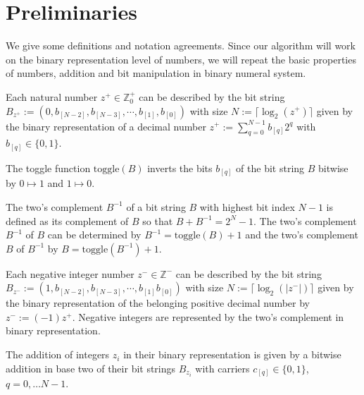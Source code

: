\section{Preliminaries}
\label{s:preliminaries}
We give some definitions and notation agreements. Since our algorithm will work on the binary representation level of numbers, we will repeat the basic properties of numbers, addition and bit manipulation in binary numeral system.


\begin{definition}
    Each natural number $z^{+} \in \mathbb{Z}^{+}_{0}$ can be described by the bit string $B_{z^{+}} := \left(0,b_{[N-2]}, b_{[N-3]},\cdots, b_{[1]}, b_{[0]}\right)$ with size $N := \lceil \log_{2}\left(z^{+}\right) \rceil$  given by the binary representation of a decimal number $z^{+} := \sum_{q = 0}^{N - 1} b_{[q]} 2^{q}$ with $b_{[q]} \in \{0, 1\}$.
\label{def:positiveintegers}
\end{definition}


\begin{definition}
    The toggle function $\mathrm{toggle}\left(B\right)$ inverts the bits $b_{[q]}$ of the bit string $B$ bitwise by $0 \mapsto 1$ and $1 \mapsto 0$.
\label{def:toggle}
\end{definition}


\begin{definition}
    The two's complement $B^{-1}$ of a bit string $B$ with highest bit index $N - 1$ is defined as its complement of $B$ so that $B + B^{-1} = 2^{N} - 1$. The two's complement $B^{-1}$ of $B$ can be determined by $B^{-1} = \mathrm{toggle}\left(B\right) + 1$ and the two's complement $B$ of $B^{-1}$ by $B = \mathrm{toggle}\left(B^{-1}\right) + 1$. 
\label{def:twoscomplement}
\end{definition}


\begin{definition}
    Each negative integer number $z^{-} \in \mathbb{Z}^{-}$ can be described by the bit string $B_{z^{-}} := \left(1, b_{[N-2]}, b_{[N-3]}, \cdots, b_{[1]} b_{[0]}\right)$ with size $N := \lceil \log_{2}\left(|z^{-}|\right) \rceil$ given by the binary representation of the belonging positive decimal number by $z^{-} := \left(-1\right)z^{+}$. Negative integers are represented by the two's complement in binary representation.
\label{def:negativeintegers}
\end{definition}


\begin{definition}
    The addition of integers $z_{i}$ in their binary representation is given by a bitwise addition in base two of their bit strings $B_{z_{i}}$ with carriers $c_{[q]} \in \{0,1\}$, $q = 0, \dots N - 1$.
\label{def:integerbinaryaddition}
\end{definition}
